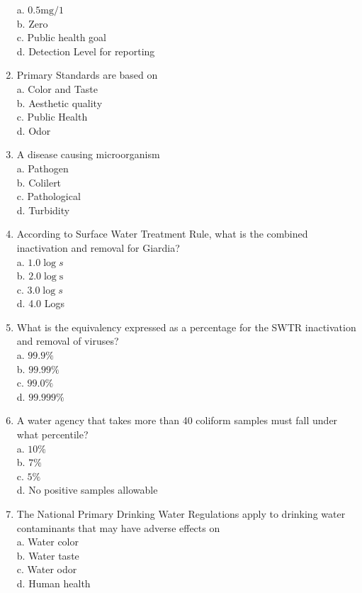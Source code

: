 \begin{enumerate}[1.]
a. $0.5 \mathrm{mg} / 1$\\
b. Zero\\
c. Public health goal\\
d. Detection Level for reporting\\
\item Primary Standards are based on\\
a. Color and Taste\\
b. Aesthetic quality\\
c. Public Health\\
d. Odor\\
\item A disease causing microorganism\\
a. Pathogen\\
b. Colilert\\
c. Pathological\\
d. Turbidity\\
\item According to Surface Water Treatment Rule, what is the combined inactivation and removal for Giardia?\\
a. $1.0 \log s$\\
b. $2.0 \log \mathrm{s}$\\
c. $3.0 \log s$\\
d. 4.0 Logs\\
\item What is the equivalency expressed as a percentage for the SWTR inactivation and removal of viruses?\\
a. $99.9 \%$\\
b. $99.99 \%$\\
c. $99.0 \%$\\
d. $99.999 \%$\\
\item A water agency that takes more than 40 coliform samples must fall under what percentile?\\
a. $10 \%$\\
b. $7 \%$\\
c. $5 \%$\\
d. No positive samples allowable\\
\item The National Primary Drinking Water Regulations apply to drinking water contaminants that may have adverse effects on\\
a. Water color\\
b. Water taste\\
c. Water odor\\
d. Human health\\

\end{enumerate}
